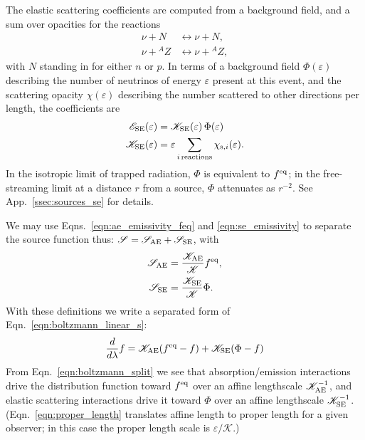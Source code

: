 \documentclass[aps,floatfix,prd,superscriptaddress,twocolumn]{revtex4-1}
\begin{document}
The elastic scattering coefficients are computed from
a background field, and a sum over opacities for
the reactions
\begin{align}
  \nu + N     &\leftrightarrow \nu + N,\nonumber\\
  \nu + {}^AZ &\leftrightarrow \nu + {}^AZ,\nonumber
\end{align}
with $N$ standing in for either $n$ or $p$.
In terms of a background field $\Phi(\varepsilon)$ describing
the number of neutrinos of energy $\varepsilon$ present at this event,
and the scattering opacity $\chi(\varepsilon)$ describing the
number scattered to other directions per length,
the coefficients are
\begin{align}
  \label{eqn:se_emissivity}
  \mathscr{E}_{\rm SE}(\varepsilon)
  &= \mathscr{K}_{\rm SE}(\varepsilon) \, \Phi(\varepsilon) \, \\
  \label{eqn:se_opacity_summed}
  \mathscr{K}_{\rm SE}(\varepsilon)
  &= \varepsilon \sum_{i\,{\rm reactions}} \chi_{{\rm s},i}(\varepsilon).
\end{align}
In the isotropic limit of trapped radiation,
$\Phi$ is equivalent to $f^{\rm eq}$;
in the free-streaming limit at a distance $r$ from a source,
$\Phi$ attenuates as $r^{-2}$.
See App.~\ref{ssec:sources_se} for details.

We may use Eqns.~\ref{eqn:ae_emissivity_feq} and \ref{eqn:se_emissivity}
to separate the source function thus:
$\mathscr{S}=\mathscr{S}_{\rm AE}+\mathscr{S}_{\rm SE}$, with
\begin{align}
  \label{eqn:source_ae}
  \mathscr{S}_{\rm AE}
  &= \frac{\mathscr{K}_{\rm AE}}{\mathscr{K}} f^{\rm eq}, \\
  \label{eqn:source_se}
  \mathscr{S}_{\rm SE}
  &= \frac{\mathscr{K}_{\rm SE}}{\mathscr{K}} \Phi.
\end{align}
With these definitions we write a separated form of
Eqn.~\ref{eqn:boltzmann_linear_s}:
\begin{equation}
  \label{eqn:boltzmann_split}
  \frac{d}{d\lambda}f =
  \mathscr{K}_{\rm AE}(f^{\rm eq}-f)
  + \mathscr{K}_{\rm SE}(\Phi-f)
\end{equation}
From Eqn.~\ref{eqn:boltzmann_split} we see that
absorption/emission interactions drive the distribution function
toward $f^{\rm eq}$ over an affine lengthscale $\mathscr{K}_{\rm AE}^{-1}$,
and elastic scattering interactions drive it
toward $\Phi$ over an affine lengthscale $\mathscr{K}_{\rm SE}^{-1}$.
(Eqn.~\ref{eqn:proper_length} translates affine length to proper length
for a given observer; in this case the proper length scale is
$\varepsilon/\mathscr{K}$.)
\end{document}
